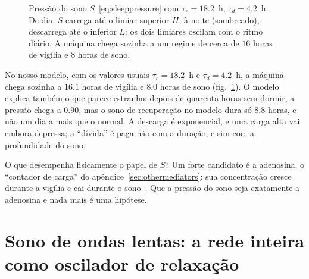\begin{figure}[t]
\centering
{}
\caption{Pressão do sono $S$~\eqref{eq:sleeppressure} com $\tau_r=18.2$~h, $\tau_d=4.2$~h. De dia, $S$ carrega até o limiar superior $H$; à noite (sombreado), descarrega até o inferior $L$; os dois limiares oscilam com o ritmo diário. A máquina chega sozinha a um regime de cerca de $16$ horas de vigília e $8$ horas de sono.}
\label{fig:twoprocess}
\end{figure}

No nosso modelo, com os valores usuais $\tau_r=18.2$~h e $\tau_d=4.2$~h, a máquina chega sozinha a $16.1$ horas de vigília e $8.0$ horas de sono (fig.~\ref{fig:twoprocess}). O modelo explica também o que parece estranho: depois de quarenta horas sem dormir, a pressão chega a $0.90$, mas o sono de recuperação no modelo dura só $8.8$ horas, e não um dia a mais que o normal. A descarga é exponencial, e uma carga alta vai embora depressa; a ``dívida'' é paga não com a duração, e sim com a profundidade do sono.

O que desempenha fisicamente o papel de $S$? Um forte candidato é a adenosina, o ``contador de carga'' do apêndice~\ref{sec:othermediators}: sua concentração cresce durante a vigília e cai durante o sono~\cite{PorkkaHeiskanen1997,Dunwiddie2001}. Que a pressão do sono seja exatamente a adenosina e nada mais é uma hipótese.

\section{Sono de ondas lentas: a rede inteira como oscilador de relaxação}

